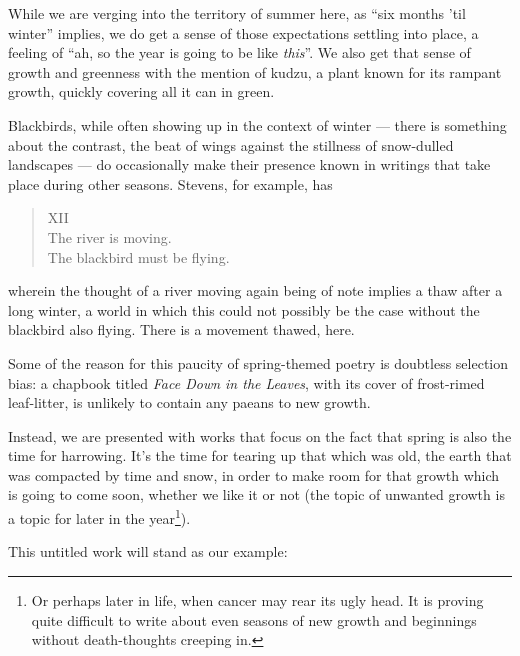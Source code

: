 While we are verging into the territory of summer here, as ``six months 'til winter'' implies, we do get a sense of those expectations settling into place, a feeling of ``ah, so the year is going to be like \emph{this}''. We also get that sense of growth and greenness with the mention of kudzu, a plant known for its rampant growth, quickly covering all it can in green.

Blackbirds, while often showing up in the context of winter --- there is something about the contrast, the beat of wings against the stillness of snow-dulled landscapes --- do occasionally make their presence known in writings that take place during other seasons. Stevens, for example, has

\begin{verse}
XII \\
The river is moving. \\
The blackbird must be flying.

\parencite{blackbird}
\end{verse}
wherein the thought of a river moving again being of note implies a thaw after a long winter, a world in which this could not possibly be the case without the blackbird also flying. There is a movement thawed, here.

Some of the reason for this paucity of spring-themed poetry is doubtless selection bias: a chapbook titled \emph{Face Down in the Leaves}, with its cover of frost-rimed leaf-litter, is unlikely to contain any paeans to new growth.

Instead, we are presented with works that focus on the fact that spring is also the time for harrowing. It's the time for tearing up that which was old, the earth that was compacted by time and snow, in order to make room for that growth which is going to come soon, whether we like it or not (the topic of unwanted growth is a topic for later in the year\footnote{Or perhaps later in life, when cancer may rear its ugly head. It is proving quite difficult to write about even seasons of new growth and beginnings without death-thoughts creeping in.}).

This untitled work will stand as our example:

